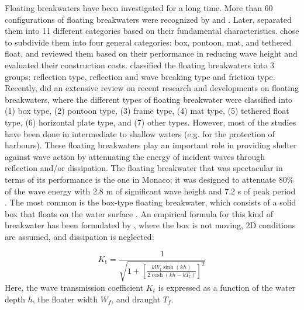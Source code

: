 Floating breakwaters have been investigated for a long time. More than 60 configurations of floating breakwaters were recognized by \parencite{jones1971transportable} and \parencite{richey1974floating}. Later, \parencite{Hales1981} separated them into 11 different categories based on their fundamental characteristics. \parencite{McCartney1985} chose to subdivide them into four general categories: box, pontoon, mat, and tethered float, and reviewed them based on their performance in reducing wave height and evaluated their construction costs. \parencite{Sawaragi1995} classified the floating breakwaters into 3 groups: reflection type, reflection and wave breaking type and friction type. Recently, \parencite{Dai2018} did an extensive review on recent research and developments on floating breakwaters, where the different types of floating breakwater were classified into (1) box type, (2) pontoon type, (3) frame type, (4) mat type, (5) tethered float type, (6) horizontal plate type, and (7) other types. However, most of the studies have been done in intermediate to shallow waters (e.g. for the protection of harbours). These floating breakwaters play an important role in providing shelter against wave action by attenuating the energy of incident waves through reflection and/or dissipation. The floating breakwater that was spectacular in terms of its performance is the one in Monaco; it was designed to attenuate 80\% of the wave energy with 2.8 m of significant wave height and 7.2 s of peak period \parencite{Ruggeri2017}. The most common is the box-type floating breakwater, which consists of a solid box that floats on the water surface \parencite{McCartney1985}. An empirical formula for this kind of breakwater has been formulated by \parencite{macagno1953fluid}, where the box is not moving, 2D conditions are assumed, and dissipation is neglected:

\begin{equation}
    K_{\mathrm{t}}=\frac{1}{\sqrt{1+\left[\frac{k W_{\mathrm{f}} \sinh (k h)}{2 \cosh \left(k h-k T_{\mathrm{f}}\right)}\right]^{2}}}
    \label{eq: macagno1953}
\end{equation}
Here, the wave transmission coefficient $K_t$ is expressed as a function of the water depth $h$, the floater width $W_f$, and draught $T_f$.\\
\\

